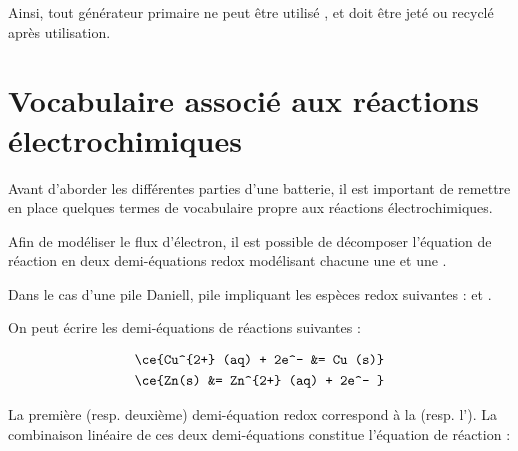 Ainsi, tout générateur primaire ne peut être utilisé , et doit être jeté ou recyclé après utilisation. 

\section{Vocabulaire associé aux réactions électrochimiques}
Avant d'aborder les différentes parties d'une batterie, il est important de remettre en place quelques termes de vocabulaire propre aux réactions électrochimiques.

Afin de modéliser le flux d'électron, il est possible de décomposer l'équation de réaction en deux demi-équations redox modélisant chacune une  et une .


Dans le cas d'une pile Daniell, pile impliquant les espèces redox suivantes :  et .

On peut écrire les demi-équations de réactions suivantes :

\begin{center}
\begin{minipage}{0.4\textwidth}
\begin{align*}
    \ce{Cu^{2+} (aq) + 2e^- &= Cu (s)} \\
    \ce{Zn(s) &= Zn^{2+} (aq) + 2e^- } \\
\end{align*}
\end{minipage}    
\end{center}

La première (resp. deuxième) demi-équation redox correspond à la  (resp. l'). La combinaison linéaire de ces deux demi-équations constitue l'équation de réaction : 

